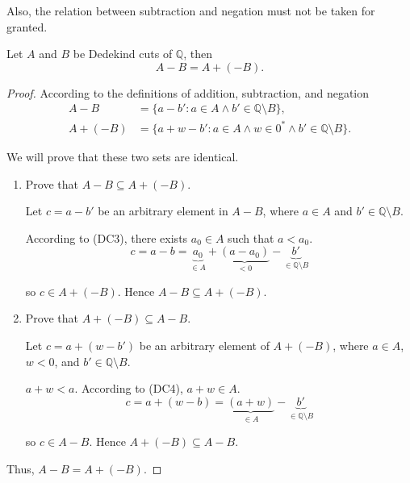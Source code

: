 Also, the relation between subtraction and negation must not be taken for granted.

\begin{theorem}\label{theorem:chapter1:negation-and-subtraction}
    Let $A$ and $B$ be Dedekind cuts of $\mathbb{Q}$, then
    \[
        A - B = A + (-B).
    \]
\end{theorem}

\begin{proof}
    According to the definitions of addition, subtraction, and negation
    \begin{align*}
        A - B    & = \{ a - b' : a\in A\land b'\in\mathbb{Q}\setminus B \},                      \\
        A + (-B) & = \{ a + w - b' : a\in A\land w\in{0}^{*}\land b'\in\mathbb{Q}\setminus B \}.
    \end{align*}

    We will prove that these two sets are identical.

    \begin{enumerate}[label={\textbf{Step \arabic*.}},itemindent=0.5cm]
        \item Prove that $A - B\subseteq A + (-B)$.

              Let $c = a - b'$ be an arbitrary element in $A - B$, where $a\in A$ and $b'\in\mathbb{Q}\setminus B$.

              According to (DC3), there exists $a_{0}\in A$ such that $a < a_{0}$.
              \[
                  c = a - b = \underbrace{a_{0}}_{\in A} + \underbrace{(a - a_{0})}_{< 0} - \underbrace{b'}_{\in\mathbb{Q}\setminus B}
              \]

              so $c\in A + (-B)$. Hence $A - B\subseteq A + (-B)$.
        \item Prove that $A + (-B)\subseteq A - B$.

              Let $c = a + (w - b')$ be an arbitrary element of $A + (-B)$, where $a\in A$, $w < 0$, and $b'\in\mathbb{Q}\setminus B$.

              $a + w < a$. According to (DC4), $a + w\in A$.
              \[
                  c = a + (w - b) = \underbrace{(a + w)}_{\in A} - \underbrace{b'}_{\in\mathbb{Q}\setminus B}
              \]

              so $c\in A - B$. Hence $A + (-B)\subseteq A - B$.
    \end{enumerate}

    Thus, $A - B = A + (-B)$.
\end{proof}

